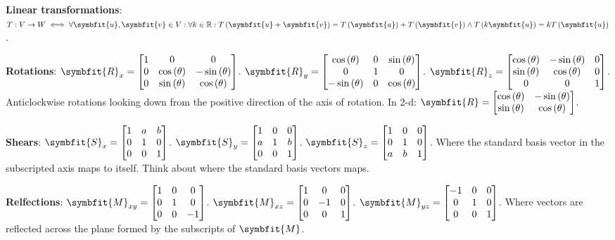 \documentclass{article}
\begin{document}
\noindent \textbf{Linear transformations}: $T:V\rightarrow W \iff \forall \symbfit{u}, \symbfit{v} \in V:\forall k \in \mathbb{R}:\func{T}{\symbfit{u}+\symbfit{v}}=\func{T}{\symbfit{u}} + \func{T}{\symbfit{v}} \wedge \func{T}{k\symbfit{u}} = k\func{T}{\symbfit{u}}$. 

\noindent \textbf{Rotations}: $\symbfit{R}_x=\mqty[1 & 0 & 0 \\ 0 & \cos{\left( \theta \right)} & -\sin{\left( \theta \right)} \\ 0 & \sin{\left( \theta \right)} & \cos{\left( \theta \right)}]$. $\symbfit{R}_y=\mqty[\cos{\left( \theta \right)} & 0 & \sin{\left( \theta \right)} \\ 0 & 1 & 0 \\ -\sin{\left( \theta \right)} & 0 & \cos{\left( \theta \right)}]$. $\symbfit{R}_z=\mqty[\cos{\left( \theta \right)} & -\sin{\left( \theta \right)} & 0 \\ \sin{\left( \theta \right)} & \cos{\left( \theta \right)} & 0 \\ 0 & 0 & 1]$. Anticlockwise rotations looking down from the positive direction of the axis of rotation.
In 2-d: $\symbfit{R}=\mqty[\cos{\left( \theta \right)} & -\sin{\left( \theta \right)} \\ \sin{\left( \theta \right)} & \cos{\left( \theta \right)}]$.
		
\noindent \textbf{Shears}: $\symbfit{S}_x=\mqty[1 & a & b \\ 0 & 1 & 0 \\ 0 & 0 & 1]$. $\symbfit{S}_y=\mqty[1 & 0 & 0 \\ a & 1 & b \\ 0 & 0 & 1]$. $\symbfit{S}_z=\mqty[1 & 0 & 0 \\ 0 & 1 & 0 \\ a & b & 1]$. Where the standard basis vector in the subscripted axis maps to itself. Think about where the standard basis vectors maps.

\noindent \textbf{Relfections}: $\symbfit{M}_{xy}=\mqty[1 & 0 & 0 \\ 0 & 1 & 0 \\ 0 & 0 & -1]$. $\symbfit{M}_{xz}=\mqty[1 & 0 & 0 \\ 0 & -1 & 0 \\ 0 & 0 & 1]$. $\symbfit{M}_{yz}=\mqty[-1 & 0 & 0 \\ 0 & 1 & 0 \\ 0 & 0 & 1]$. Where vectors are reflected across the plane formed by the subscripts of $\symbfit{M}$.
\end{document}
